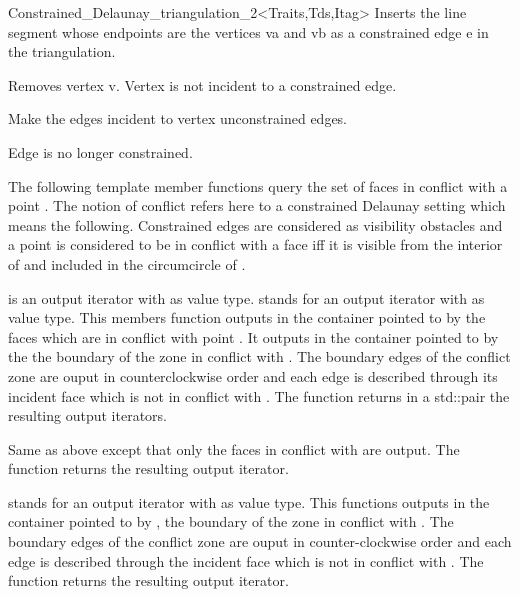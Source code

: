 \begin{ccRefClass}{Constrained_Delaunay_triangulation_2<Traits,Tds,Itag>}
{ Inserts the line segment whose endpoints are the vertices va and vb
as a constrained  edge e in the triangulation. }


{ Removes vertex v. 
\ccPrecond Vertex   is not incident to a constrained edge.}

{Make the edges incident to vertex  unconstrained edges.}

{ Edge   is no longer constrained.}


The following template member functions query the
set of faces in conflict with a point .
The notion of conflict refers here to a 
constrained Delaunay setting which means the following.
Constrained edges are considered as visibility obstacles
and a point  is considered to be 
in conflict with a face  iff it is 
 visible from the interior of  and 
included in the circumcircle of .

{  is an output iterator with  as value type.
 stands for an output iterator with  as value type.
This members function outputs in the container pointed to by 
the faces which are in conflict with point .
It outputs in the container pointed to by  the 
the boundary of the zone in conflict with .
The boundary edges
of the conflict  zone are ouput in counterclockwise order
and each edge is described  through its incident face
which is not in conflict with .
The function returns in a std::pair the resulting output iterators.
}

{Same as above except that only the faces in conflict with 
are output. The function returns the resulting output iterator.}

{  stands for an output iterator with 
 as value
type.
 This functions  outputs in the container pointed to by ,
the boundary of the zone in conflict with . The boundary edges
of the conflict  zone are ouput in counter-clockwise order
and each edge is described  through the incident face
which is not in conflict with .
The function returns the resulting output iterator.}



\end{ccRefClass}
